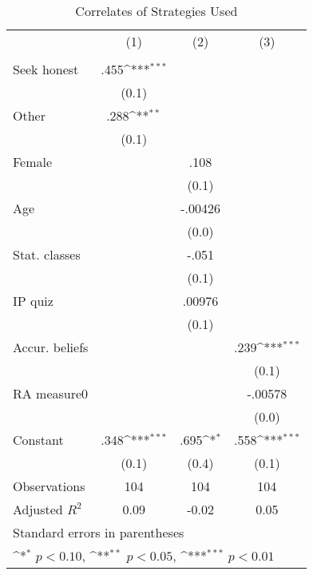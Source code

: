 \begin{table}[htbp]\centering
\def\sym#1{\ifmmode^{#1}\else\(^{#1}\)\fi}
\caption{Correlates of Strategies Used}
\begin{tabular}{l*{3}{c}}
\hline\hline
                &\multicolumn{1}{c}{(1)}&\multicolumn{1}{c}{(2)}&\multicolumn{1}{c}{(3)}\\
                &\multicolumn{1}{c}{}&\multicolumn{1}{c}{}&\multicolumn{1}{c}{}\\
\hline
Seek honest     &     .455\sym{***}&                  &                  \\
                &    (0.1)         &                  &                  \\
Other           &     .288\sym{**} &                  &                  \\
                &    (0.1)         &                  &                  \\
Female          &                  &     .108         &                  \\
                &                  &    (0.1)         &                  \\
Age             &                  &  -.00426         &                  \\
                &                  &    (0.0)         &                  \\
Stat. classes   &                  &    -.051         &                  \\
                &                  &    (0.1)         &                  \\
IP quiz         &                  &   .00976         &                  \\
                &                  &    (0.1)         &                  \\
Accur. beliefs  &                  &                  &     .239\sym{***}\\
                &                  &                  &    (0.1)         \\
RA measure0     &                  &                  &  -.00578         \\
                &                  &                  &    (0.0)         \\
Constant        &     .348\sym{***}&     .695\sym{*}  &     .558\sym{***}\\
                &    (0.1)         &    (0.4)         &    (0.1)         \\
\hline
Observations    &      104         &      104         &      104         \\
Adjusted \(R^{2}\)&     0.09         &    -0.02         &     0.05         \\
\hline\hline
\multicolumn{4}{l}{\footnotesize Standard errors in parentheses}\\
\multicolumn{4}{l}{\footnotesize \sym{*} \(p<0.10\), \sym{**} \(p<0.05\), \sym{***} \(p<0.01\)}\\
\end{tabular}
\end{table}

